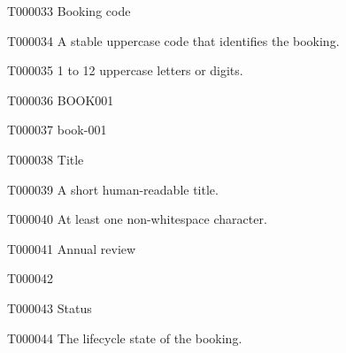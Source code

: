 \documentclass[11pt,a4paper]{article}
\begin{document}
\begin{atlastext}{T000033}
Booking code
\end{atlastext}
\begin{atlasparagraph}{T000034}
A stable uppercase code that identifies the booking.
\end{atlasparagraph}
\begin{atlasparagraph}{T000035}
1 to 12 uppercase letters or digits.
\end{atlasparagraph}
\begin{atlasitem}{T000036}
BOOK001
\end{atlasitem}
\begin{atlasitem}{T000037}
book-001
\end{atlasitem}
\begin{atlastext}{T000038}
Title
\end{atlastext}
\begin{atlasparagraph}{T000039}
A short human-readable title.
\end{atlasparagraph}
\begin{atlasparagraph}{T000040}
At least one non-whitespace character.
\end{atlasparagraph}
\begin{atlasitem}{T000041}
Annual review
\end{atlasitem}
\begin{atlasitem}{T000042}
   
\end{atlasitem}
\begin{atlastext}{T000043}
Status
\end{atlastext}
\begin{atlasparagraph}{T000044}
The lifecycle state of the booking.
\end{atlasparagraph}
\end{document}
